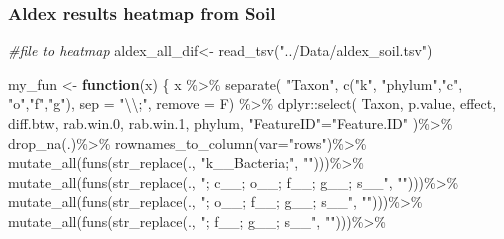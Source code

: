 \documentclass[]{interact}
\theoremstyle{plain}%
\theoremstyle{definition}
\theoremstyle{remark}
\newenvironment{Shaded}{\begin{snugshade}}{\end{snugshade}}
\newcommand{\AttributeTok}[1]{\textcolor[rgb]{0.77,0.63,0.00}{#1}}
\newcommand{\CommentTok}[1]{\textcolor[rgb]{0.56,0.35,0.01}{\textit{#1}}}
\newcommand{\ControlFlowTok}[1]{\textcolor[rgb]{0.13,0.29,0.53}{\textbf{#1}}}
\newcommand{\FloatTok}[1]{\textcolor[rgb]{0.00,0.00,0.81}{#1}}
\newcommand{\FunctionTok}[1]{\textcolor[rgb]{0.00,0.00,0.00}{#1}}
\newcommand{\NormalTok}[1]{#1}
\newcommand{\OtherTok}[1]{\textcolor[rgb]{0.56,0.35,0.01}{#1}}
\newcommand{\SpecialCharTok}[1]{\textcolor[rgb]{0.00,0.00,0.00}{#1}}
\newcommand{\StringTok}[1]{\textcolor[rgb]{0.31,0.60,0.02}{#1}}
\begin{document}
\hypertarget{aldex-results-heatmap-from-soil}{%
\subsubsection{Aldex results heatmap from
Soil}\label{aldex-results-heatmap-from-soil}}

\begin{Shaded}
\begin{Highlighting}[]
\CommentTok{\#file to heatmap}
\NormalTok{aldex\_all\_dif}\OtherTok{\textless{}{-}} \FunctionTok{read\_tsv}\NormalTok{(}\StringTok{"../Data/aldex\_soil.tsv"}\NormalTok{)}

\NormalTok{my\_fun }\OtherTok{\textless{}{-}} \ControlFlowTok{function}\NormalTok{(x) \{ }
\NormalTok{  x }\SpecialCharTok{\%\textgreater{}\%} \FunctionTok{separate}\NormalTok{(}
    \StringTok{"Taxon"}\NormalTok{, }\FunctionTok{c}\NormalTok{(}\StringTok{"k"}\NormalTok{, }\StringTok{"phylum"}\NormalTok{,}\StringTok{"c"}\NormalTok{, }\StringTok{"o"}\NormalTok{,}\StringTok{"f"}\NormalTok{,}\StringTok{"g"}\NormalTok{),}
    \AttributeTok{sep =} \StringTok{"}\SpecialCharTok{\textbackslash{}\textbackslash{}}\StringTok{;"}\NormalTok{, }\AttributeTok{remove =}\NormalTok{ F) }\SpecialCharTok{\%\textgreater{}\%}\NormalTok{ dplyr}\SpecialCharTok{::}\FunctionTok{select}\NormalTok{(}
\NormalTok{      Taxon, p.value, effect, diff.btw, rab.win}\FloatTok{.0}\NormalTok{, rab.win}\FloatTok{.1}\NormalTok{, phylum, }
      \StringTok{"FeatureID"}\OtherTok{=}\StringTok{"Feature.ID"}\NormalTok{ )}\SpecialCharTok{\%\textgreater{}\%} 
    \FunctionTok{drop\_na}\NormalTok{(.)}\SpecialCharTok{\%\textgreater{}\%} 
    \FunctionTok{rownames\_to\_column}\NormalTok{(}\AttributeTok{var=}\StringTok{"rows"}\NormalTok{)}\SpecialCharTok{\%\textgreater{}\%}       
    \FunctionTok{mutate\_all}\NormalTok{(}\FunctionTok{funs}\NormalTok{(}\FunctionTok{str\_replace}\NormalTok{(., }\StringTok{"k\_\_Bacteria;"}\NormalTok{, }\StringTok{""}\NormalTok{)))}\SpecialCharTok{\%\textgreater{}\%}
    \FunctionTok{mutate\_all}\NormalTok{(}\FunctionTok{funs}\NormalTok{(}\FunctionTok{str\_replace}\NormalTok{(., }\StringTok{"; c\_\_; o\_\_; f\_\_; g\_\_; s\_\_"}\NormalTok{, }\StringTok{""}\NormalTok{)))}\SpecialCharTok{\%\textgreater{}\%} 
    \FunctionTok{mutate\_all}\NormalTok{(}\FunctionTok{funs}\NormalTok{(}\FunctionTok{str\_replace}\NormalTok{(., }\StringTok{"; o\_\_; f\_\_; g\_\_; s\_\_"}\NormalTok{, }\StringTok{""}\NormalTok{)))}\SpecialCharTok{\%\textgreater{}\%} 
    \FunctionTok{mutate\_all}\NormalTok{(}\FunctionTok{funs}\NormalTok{(}\FunctionTok{str\_replace}\NormalTok{(., }\StringTok{"; f\_\_; g\_\_; s\_\_"}\NormalTok{, }\StringTok{""}\NormalTok{)))}\SpecialCharTok{\%\textgreater{}\%}

\end{Highlighting}
\end{Shaded}
\end{document}
